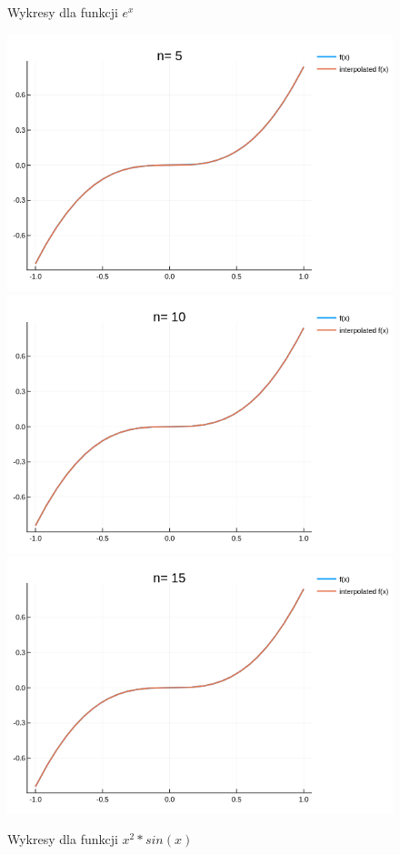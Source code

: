 \documentclass[12pt, a4paper]{article}
\begin{document}
\begin{figure}[h]
    \caption{Wykresy dla funkcji $e^x$}
\end{figure}

\newpage

\begin{figure}[h]
    \centering
    \includegraphics[scale=0.35]{../plots/ex5/2.png}
    \includegraphics[scale=0.35]{../plots/ex5/5.png}
    \includegraphics[scale=0.35]{../plots/ex5/6.png}    
    \caption{Wykresy dla funkcji $x^2*sin(x)$}
\end{figure}
\end{document}
